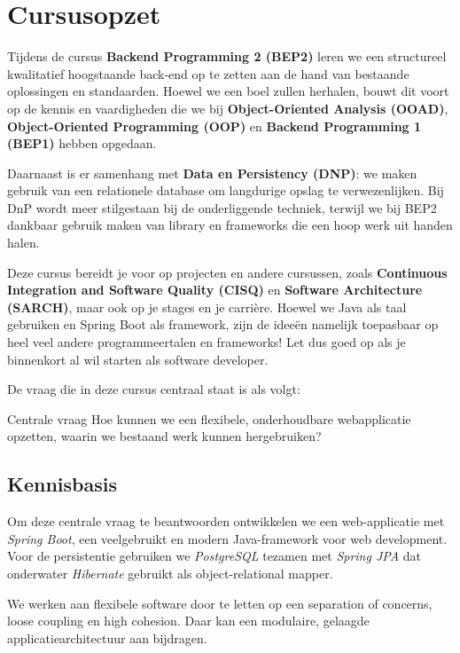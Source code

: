 \documentclass[dutch,a4paper,12pt,doubleside]{book}
\begin{document}
\chapter*{Cursusopzet}

Tijdens de cursus \textbf{Backend Programming 2 (BEP2)} leren we 
een structureel kwalitatief hoogstaande back-end 
op te zetten aan de hand van bestaande oplossingen en standaarden.
Hoewel we een boel zullen herhalen, bouwt dit voort 
op de kennis en vaardigheden
die we bij \textbf{Object-Oriented Analysis (OOAD)}, 
\textbf{Object-Oriented Programming (OOP)}
en \textbf{Backend Programming 1 (BEP1)} hebben opgedaan.

Daarnaast is er samenhang met \textbf{Data en Persistency (DNP)}:
we maken gebruik van een  relationele database om langdurige 
opslag te verwezenlijken. Bij DnP wordt meer stilgestaan bij 
de onderliggende techniek, terwijl we bij BEP2 dankbaar gebruik 
maken van library en frameworks die een hoop werk uit handen halen.

Deze cursus bereidt je voor op projecten en andere cursussen, zoals
\textbf{Continuous Integration and Software Quality (CISQ)} 
en \textbf{Software Architecture (SARCH)},
maar ook op je stages en je carrière. Hoewel we Java als taal gebruiken 
en Spring Boot als framework, zijn de ideeën namelijk
toepasbaar op heel veel andere programmeertalen en frameworks!
Let dus goed op als je binnenkort al wil starten als software developer.

De vraag die in deze cursus centraal staat is als volgt:

\begin{defbox}{Centrale vraag}
Hoe kunnen we een flexibele, onderhoudbare webapplicatie opzetten, waarin we bestaand werk kunnen hergebruiken?
\end{defbox}

\newpage
\section*{Kennisbasis}
Om deze centrale vraag te beantwoorden ontwikkelen we 
een web-applicatie met \textit{Spring Boot}, een veelgebruikt 
en modern Java-framework voor web development. Voor de persistentie 
gebruiken we \textit{PostgreSQL} tezamen met \textit{Spring JPA} dat
onderwater \textit{Hibernate} gebruikt als object-relational mapper.

We werken aan flexibele software door te letten
op een separation of concerns, loose coupling en high cohesion.
Daar kan een modulaire, gelaagde applicatiearchitectuur aan bijdragen.
\end{document}
